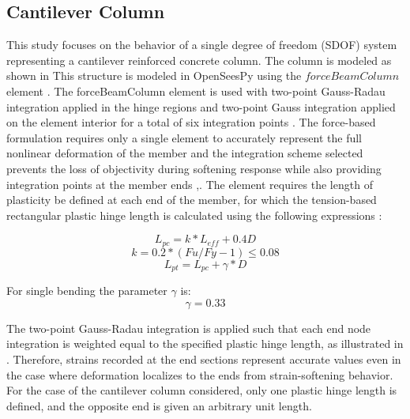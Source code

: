 \subsection{Cantilever Column}
This study focuses on the behavior of a single degree of freedom (SDOF) system representing a cantilever reinforced concrete column. The column is modeled as shown in  This structure is modeled in OpenSeesPy \cite{McKenna2010}\cite{Zhu2018} using the $forceBeamColumn$ element \cite{Scott}. The forceBeamColumn element is used with two-point Gauss-Radau integration applied in the hinge regions and two-point Gauss integration applied on the element interior for a total of six integration points \cite{Scott}. The force-based formulation requires only a single element to accurately represent the full nonlinear deformation of the member and the integration scheme selected prevents the loss of objectivity during softening response while also providing integration points at the member ends \cite{Calabrese2010},\cite{Scott}. The element requires the length of plasticity be defined at each end of the member, for which the tension-based rectangular plastic hinge length is calculated using the following expressions \cite{Goodnight2013}:

\begin{equation}
    L_{pc}=k*L_{eff} + 0.4D
    \label{eq:LP_Comp}
\end{equation}
\begin{equation}
	k=0.2*(Fu/Fy - 1) \leqslant 0.08
	\label{eq:K_Lp}
\end{equation}
\begin{equation}
    L_{pt}=L_{pc}+\gamma*D
    \label{eq:LP_Tension}
\end{equation}

For single bending the parameter $\gamma$ is:
\begin{equation}
    \gamma=0.33
    \label{eq:Gamma_LPt}
\end{equation}

The two-point Gauss-Radau integration is applied such that each end node integration is weighted equal to the specified plastic hinge length, as illustrated in . Therefore, strains recorded at the end sections represent accurate values even in the case where deformation localizes to the ends from strain-softening behavior. For the case of the cantilever column considered, only one plastic hinge length is defined, and the opposite end is given an arbitrary unit length. 

